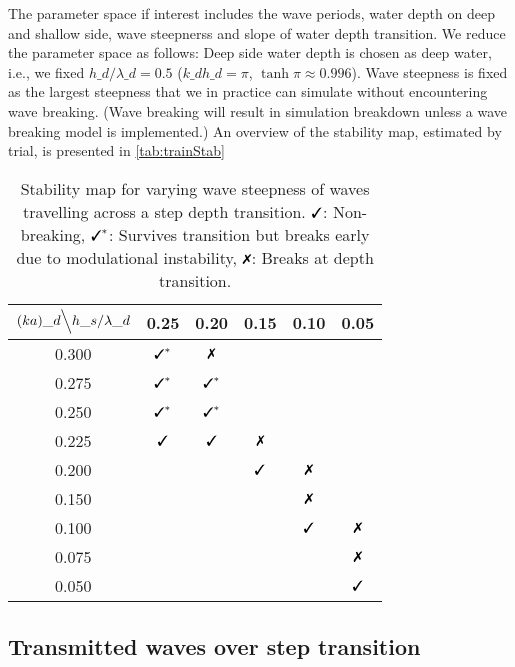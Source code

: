 The parameter space if interest includes the wave periods, water depth on deep and shallow side, wave steepnerss and slope of water depth transition.
We reduce the parameter space as follows: Deep side water depth is chosen as deep water,
i.e., we fixed $h\_d/\lambda\_d=0.5$ ($k\_dh\_d=\pi$, $\tanh\pi\approx0.996$).
Wave steepness is fixed as the largest steepness that we in practice can simulate without encountering wave breaking. 
(Wave breaking will result in simulation breakdown unless a wave breaking model is implemented.)
An overview of the stability map, estimated by trial, is presented in \autoref{tab:trainStab}
\\

\begin{table}[H]%
\centering
\begin{tabular}{c|ccccc}
$(ka)\_d\Big\backslash h\_s/\lambda\_d$		&0.25	 &0.20      &0.15&0.10&0.05\\\hline
0.300  	& $\cmark^*$ & $\xmark$ &  &&	\\
0.275  &$\cmark^*$&$\cmark^*$&&&\\
0.250  &$\cmark^*$&$\cmark^*$&&&\\
0.225 &$\cmark$& $\cmark$& $\xmark$ &&\\
0.200 &&&$\cmark$&$\xmark$&\\
0.150 &&&&$\xmark$&\\
0.100  &&&&$\cmark$& $\xmark$\\
0.075 &&&&& $\xmark$\\
0.050 &&&&&$\cmark$
\end{tabular}
\caption{Stability map for varying wave steepness of waves travelling across a step depth transition. $\cmark$: Non-breaking, $\cmark^*$: Survives transition but breaks early due to modulational instability, $\xmark$: Breaks at depth transition.}
\label{tab:trainStab}
\end{table}


\subsection{Transmitted waves over step transition}

